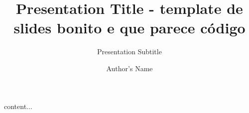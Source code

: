 \documentclass{beamer}
\title{Presentation Title - template de slides bonito e que parece código}
\subtitle{Presentation Subtitle}
\author{Author's Name}
\begin{document}
\begin{frame}
\maketitle
\end{frame}

\begin{frame}
content...
\end{frame}
\end{document}

